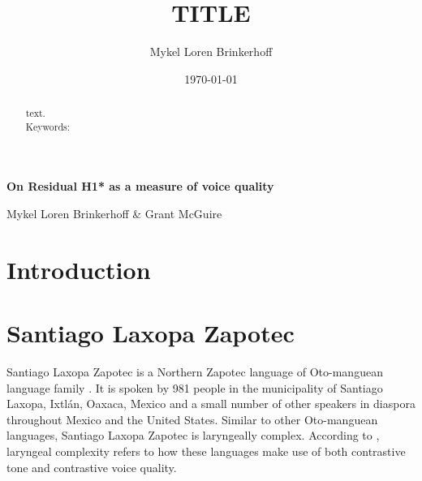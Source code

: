 \documentclass[12pt, letterpaper]{article}
\title{TITLE}
\author{Mykel Loren Brinkerhoff}
\date{\today}
\begin{document}

	\onehalfspacing

\begin{center}
     {\Large \textbf{On Residual H1* as a measure of voice quality}}
     \vspace{6pt}

     Mykel Loren Brinkerhoff \& Grant McGuire
\end{center}
\thispagestyle{fancy}


\begin{abstract}
    text.
    \\
    Keywords:
\end{abstract}

\section{Introduction} \label{sec:Introduction}


\section{Santiago Laxopa Zapotec} \label{sec:SLZ}

Santiago Laxopa Zapotec is a Northern Zapotec language of Oto-manguean language family \citep{adlerAcousticsPhonationTypes2016,adlerDerivationVerbInitiality2018,foleyForbiddenCliticClusters2018,foleyExtendingPersonCaseConstraint2020,sichelPronounsAttractionSierra2020,
sichelFeaturalLifeNominals2020,brinkerhoffDownstepSantiagoLaxopaMFM,brinkerhoffTonalPatternsTheir2022}. It is spoken by 981 people in the municipality of Santiago Laxopa, Ixtlán, Oaxaca, Mexico \citep{SantiagoLaxopaEconomy} and a small number of other speakers in diaspora throughout Mexico and the United States. Similar to other Oto-manguean languages, Santiago Laxopa Zapotec is laryngeally complex. According to \citet{silvermanLaryngealComplexityOtomanguean1997,silvermanPhasingRecoverability1997,blankenshipTimeCourseBreathiness1997,blankenshipTimingNonmodalPhonation2002}, laryngeal complexity refers to how these languages make use of both contrastive tone and contrastive voice quality. 
\end{document}
